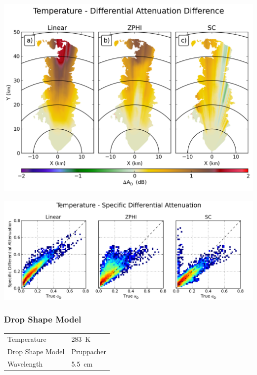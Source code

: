 \documentclass[red]{beamer}
\begin{document}
\begin{frame}
	\begin{center}
		\includegraphics[scale=0.45]{figures/C_Temperature_Differential_Attenuation_Difference.png}
	\end{center}
\end{frame}

\begin{frame}
	\begin{center}
		\includegraphics[scale=0.45]{figures/C_Temperature_Specific_Differential_Attenuation_scatter.png}
	\end{center}
\end{frame}

\begin{frame}
	\frametitle{Drop Shape Model}
	\begin{center}
	    \begin{tabular}{ | l | l | }
	        \hline
	        Temperature & \SI{283}{\kelvin} \\
	        Drop Shape Model & Pruppacher \\
	        Wavelength & \SI{5.5}{\centi\meter} \\
			\hline
	    \end{tabular}
	\end{center}	
\end{frame}
\end{document}
